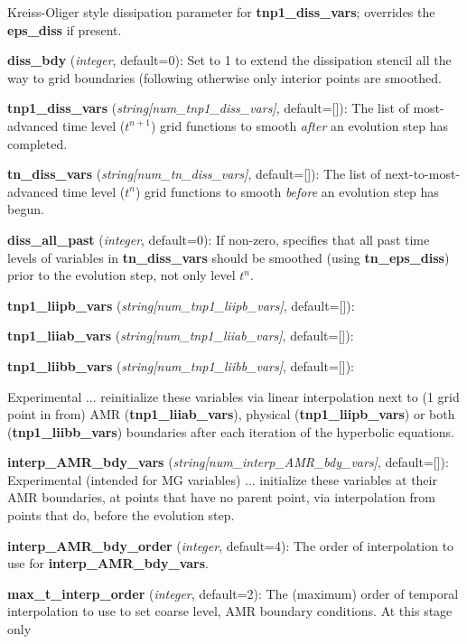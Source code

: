 \documentclass[aps,amssymb,unsortedaddress,nofootinbib]{revtex4}
\def\lsep{\itemsep 0.05in}
\begin{document}
\begin{list}{}{\lsep}
      Kreiss-Oliger style dissipation parameter for {\bf tnp1\_diss\_vars}; overrides
      the {\bf eps\_diss} if present.
\item {\bf diss\_bdy} ({\em integer}, default=0):
      Set to 1 to extend the dissipation stencil all the way to grid boundaries
      (following \cite{calabrese_et_al} otherwise only interior points are smoothed.
\item {\bf tnp1\_diss\_vars} ({\em string[num\_tnp1\_diss\_vars]}, default=[]):
      The list of most-advanced time level ($t^{n+1}$) grid functions to smooth 
      {\em after} an evolution step has completed.
\item {\bf tn\_diss\_vars} ({\em string[num\_tn\_diss\_vars]}, default=[]):
      The list of next-to-most-advanced time level ($t^{n}$) grid functions to smooth 
      {\em before} an evolution step has begun.
\item {\bf diss\_all\_past} ({\em integer}, default=0):
      If non-zero, specifies that all past time levels of variables in 
      {\bf tn\_diss\_vars} should be smoothed (using {\bf tn\_eps\_diss})
      prior to the evolution step, not only level $t^n$.
\item {\bf tnp1\_liipb\_vars} ({\em string[num\_tnp1\_liipb\_vars]}, default=[]):
\item {\bf tnp1\_liiab\_vars} ({\em string[num\_tnp1\_liiab\_vars]}, default=[]):
\item {\bf tnp1\_liibb\_vars} ({\em string[num\_tnp1\_liibb\_vars]}, default=[]): \par
      Experimental ... reinitialize these variables via linear interpolation next to (1 grid point in from) 
      AMR ({\bf tnp1\_liiab\_vars}), physical ({\bf tnp1\_liipb\_vars}) or both
      ({\bf tnp1\_liibb\_vars}) boundaries after each iteration of the hyperbolic equations.
\item {\bf interp\_AMR\_bdy\_vars} ({\em string[num\_interp\_AMR\_bdy\_vars]}, default=[]):
      Experimental (intended for MG variables) ... initialize these variables at their AMR boundaries,
      at points that have no parent point, via interpolation from points that do,
      before the evolution step.
\item {\bf interp\_AMR\_bdy\_order} ({\em integer}, default=4):
      The order of interpolation to use for {\bf interp\_AMR\_bdy\_vars}.
\item {\bf max\_t\_interp\_order} ({\em integer}, default=2): The (maximum) order of temporal
      interpolation to use to set coarse level, AMR boundary conditions. At this stage only

\end{list}
\end{document}
